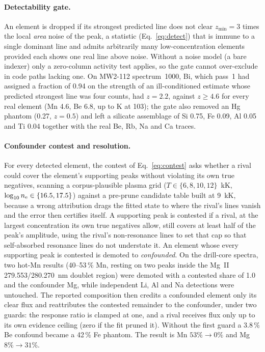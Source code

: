 \paragraph{Detectability gate.}
An element is dropped if its strongest predicted line does not clear $z_{\min}=3$ times the
local \emph{area} noise of the peak, a statistic (Eq.~\eqref{eq:detect}) that is immune to a
single dominant line and admits arbitrarily many low-concentration elements provided each
shows one real line above noise.
Without a noise model (a bare indexer) only a zero-column activity test applies, so the gate
cannot over-exclude in code paths lacking one.
On MW2-112 spectrum~1000, Bi, which pass~1 had assigned a fraction of 0.94 on the strength of an
ill-conditioned estimate whose predicted strongest line was four counts, had $z = 2.2$,
against $z \ge 4.6$ for every real element (Mn 4.6, Be 6.8, up to K at 103); the gate also
removed an Hg phantom (0.27, $z=0.5$) and left a silicate assemblage of Si 0.75, Fe 0.09,
Al 0.05 and Ti 0.04 together with the real Be, Rb, Na and Ca traces.

\paragraph{Confounder contest and resolution.}
For every detected element, the contest of Eq.~\eqref{eq:contest} asks whether a rival could
cover the element's supporting peaks without violating its own true negatives, scanning a
corpus-plausible plasma grid ($T\in\{6,8,10,12\}$~kK, $\log_{10}n_{\mathrm{e}}\in\{16.5,17.5\}$)
against a pre-prune candidate table built at \SI{9}{kK}, because a wrong attribution drags
the fitted state to where the rival's lines vanish and the error then certifies itself.
A supporting peak is contested if a rival, at the largest concentration its own true
negatives allow, still covers at least half of the peak's amplitude, using the rival's
non-resonance lines to set that cap so that self-absorbed resonance lines do not
understate it.
An element whose every supporting peak is contested is demoted to \emph{confounded}.
On the drill-core spectra, two hot-Mn results (40--53\,\% Mn, resting on two peaks inside
the Mg~II 279.553/\SI{280.270}{nm} doublet region) were demoted with a contested share of 1.0
and the confounder Mg, while independent Li, Al and Na detections were untouched.
The reported composition then credits a confounded element only its clear flux and
reattributes the contested remainder to the confounder, under two guards: the response
ratio is clamped at one, and a rival receives flux only up to its own evidence ceiling
(zero if the fit pruned it).
Without the first guard a 3.8\,\% Be confound became a 42\,\% Fe phantom.
The result is Mn $53\%\to 0\%$ and Mg $8\%\to 31\%$.

